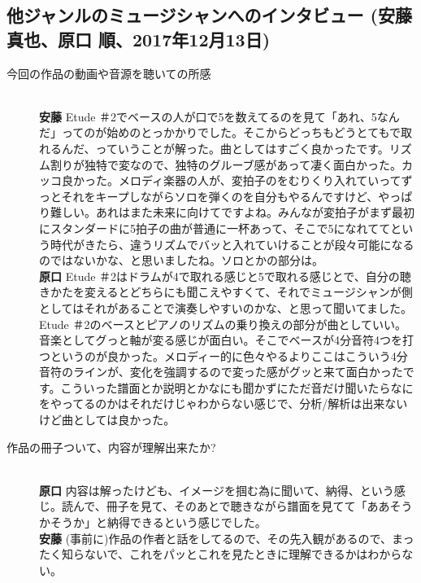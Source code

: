 \documentclass[uplatex,dvipdfmx]{ujarticle}
\begin{document}
\subsection{他ジャンルのミュージシャンへのインタビュー (安藤 真也、原口 順、2017年12月13日)}

\begin{description}
\item[今回の作品の動画や音源を聴いての所感]\mbox{}\\

{\bf 安藤} Etude ＃2でベースの人が口で5を数えてるのを見て「あれ、5なんだ」ってのが始めのとっかかりでした。そこからどっちもどうとてもで取れるんだ、っていうことが解った。曲としてはすごく良かったです。リズム割りが独特で変なので、独特のグルーブ感があって凄く面白かった。カッコ良かった。メロディ楽器の人が、変拍子のをむりくり入れていってずっとそれをキープしながらソロを弾くのを自分もやるんですけど、やっぱり難しい。あれはまた未来に向けてですよね。みんなが変拍子がまず最初にスタンダードに5拍子の曲が普通に一杯あって、そこで5になれててという時代がきたら、違うリズムでバッと入れていけることが段々可能になるのではないかな、と思いましたね。ソロとかの部分は。\\

{\bf 原口} Etude ＃2はドラムが4で取れる感じと5で取れる感じとで、自分の聴きかたを変えるとどちらにも聞こえやすくて、それでミュージシャンが側としてはそれがあることで演奏しやすいのかな、と思って聞いてました。Etude ＃2のベースとピアノのリズムの乗り換えの部分が曲としていい。音楽としてグっと軸が変る感じが面白い。そこでベースが4分音符4つを打つというのが良かった。メロディー的に色々やるよりここはこういう4分音符のラインが、変化を強調するので変った感がグッと来て面白かったです。こういった譜面とか説明とかなにも聞かずにただ音だけ聞いたらなにをやってるのかはそれだけじゃわからない感じで、分析/解析は出来ないけど曲としては良かった。\\

\item [作品の冊子ついて、内容が理解出来たか?]\mbox{}\\

{\bf 原口} 内容は解ったけども、イメージを掴む為に聞いて、納得、という感じ。読んで、冊子を見て、そのあとで聴きながら譜面を見てて「ああそうかそうか」と納得できるという感じでした。\\

{\bf 安藤} (事前に)作品の作者と話をしてるので、その先入観があるので、まったく知らないで、これをパッとこれを見たときに理解できるかはわからない。\\


\end{description}
\end{document}
